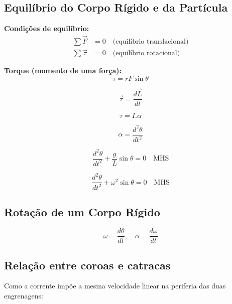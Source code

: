 \documentclass[a4paper,12pt]{article}
\begin{document}
\begin{multicols}{2}
\section{Equilíbrio do Corpo Rígido e da Partícula}

\textbf{Condições de equilíbrio:}
\begin{align*}
  \sum \vec{F} &= 0 \quad \text{(equilíbrio translacional)} \\
  \sum \vec{\tau} &= 0 \quad \text{(equilíbrio rotacional)}
\end{align*}

\textbf{Torque (momento de uma força):}
\begin{equation*}
  \tau = r F \sin \theta
\end{equation*}

\begin{equation}
  \vec{\tau} = \frac{d\vec{L}}{dt}
\end{equation}

\begin{equation}
  \tau = I.\alpha
\end{equation}

\begin{equation}
  \alpha = \frac{d^{2}\theta}{dt^{2}}
\end{equation}

\begin{equation}
  \frac{d^{2}\theta}{dt^{2}} + \frac{g}{L}\sin\theta = 0 \quad \textrm{MHS}
\end{equation}

\begin{equation}
  \frac{d^{2}\theta}{dt^{2}} + \omega^{2}\sin\theta = 0 \quad \textrm{MHS}
\end{equation}

\subsection{Rota\c{c}\~ao de um Corpo R\'igido}
\begin{equation*}
  \omega = \frac{d\theta}{dt}, \quad \alpha = \frac{d\omega}{dt}
\end{equation*}

\subsection{Relação entre coroas e catracas}

Como a corrente impõe a mesma velocidade linear na periferia das duas engrenagens:


\end{multicols}
\end{document}
